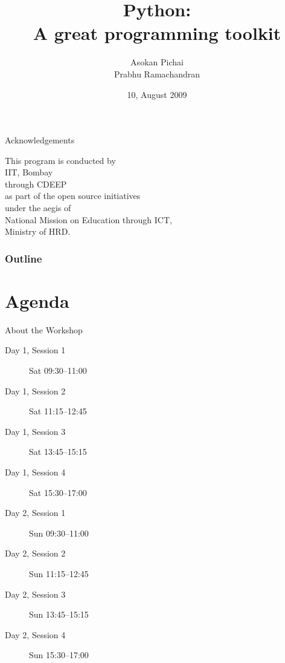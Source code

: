 \documentclass[14pt,compress]{beamer}
\title[Basic Python]{Python:\\A great programming toolkit}
\author[Asokan \& Prabhu] {Asokan Pichai\\Prabhu Ramachandran}
\institute[IIT Bombay] {Department of Aerospace Engineering\\IIT Bombay}
\date[] {10, August 2009}
\begin{document}
\begin{frame}
  \titlepage
\end{frame}
\begin{frame}
  {Acknowledgements}
  \begin{center}
  This program is conducted by\\
  IIT, Bombay\\
  through CDEEP\\as part of  the open source initiatives\\
  under the aegis of\\
  \alert{National Mission on Education through ICT,} \\
  Ministry of HRD.
  \end{center}
\end{frame}

\begin{frame}
  \frametitle{Outline}
  \tableofcontents
\end{frame}

%

\section{Agenda}
\begin{frame}{About the Workshop}
  \begin{description}
	\item[Day 1, Session 1] Sat 09:30--11:00
	\item[Day 1, Session 2] Sat 11:15--12:45
	\item[Day 1, Session 3] Sat 13:45--15:15
	\item[Day 1, Session 4] Sat 15:30--17:00
        \item[Day 2, Session 1] Sun 09:30--11:00
	\item[Day 2, Session 2] Sun 11:15--12:45
	\item[Day 2, Session 3] Sun 13:45--15:15
	\item[Day 2, Session 4] Sun 15:30--17:00
  \end{description}
\end{frame}
\end{document}
